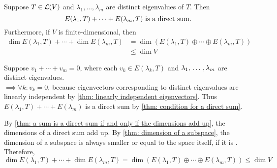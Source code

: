 \setcounter{thm}{53}
\begin{thm} 
  \label{thm: sum of eigenspaces is a direct sum}
  Suppose $T\in \mathcal{L} (V)$ and $\lambda_1, \dots, \lambda_m$ are distinct eigenvalues of $T$. Then
  \begin{equation}
    E(\lambda_1, T) + \cdots + E(\lambda_m, T) $ is a direct sum.$
  \end{equation}
  Furthermore, if $V$ is finite-dimensional, then
  \begin{equation}
    \begin{aligned}
      \dim E(\lambda_1, T) + \cdots + \dim E(\lambda_m, T)
      & = \dim \left( E(\lambda_1, T)  \oplus \cdots \oplus E(\lambda_m, T) \right) \\
      & \leq \dim V
    \end{aligned}
  \end{equation}
\end{thm}
\begin{prf}
  Suppose $v_1 + \cdots + v_m = 0$, where each $v_k \in E(\lambda_k, T)$ and $\lambda_1, {\, \ldots \,\,}, \lambda_m$ are distinct eigenvalues. \\
  $\implies \forall k: v_k = 0$, because eigenvectors corresponding to distinct eigenvalues are linearly independent by \ref{thm: linearly independent eigenvectors}. Thus $E(\lambda_1, T) + \cdots + E(\lambda_m)$ is a direct sum by \ref{thm: condition for a direct sum}.

  By \ref{thm: a sum is a direct sum if and only if the dimensions add up}, the dimensions of a direct sum add up. By \ref{thm: dimension of a subspace}, the dimension of a subspace is always smaller or equal to the space itself, if it is \fd. Therefore,
  $
      \dim E(\lambda_1, T) + \cdots + \dim E(\lambda_m, T)
       = \dim \left( E(\lambda_1, T)  \oplus \cdots \oplus E(\lambda_m, T) \right)
       \leq \dim V
  $
\end{prf}

